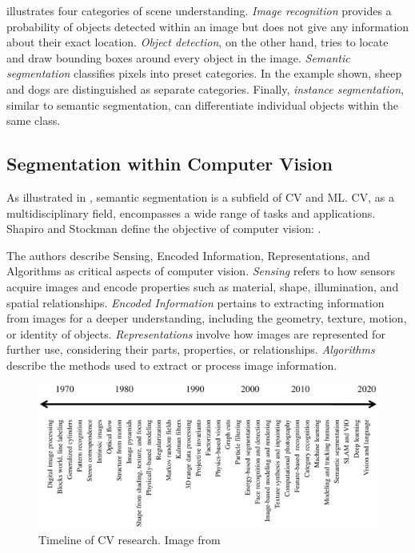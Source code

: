  illustrates four categories of scene understanding. \textit{Image recognition} provides a probability of objects detected within an image but does not give any information about their exact location. \textit{Object detection}, on the other hand, tries to locate and draw bounding boxes around every object in the image. \textit{Semantic segmentation} classifies pixels into preset categories. In the example shown, sheep and dogs are distinguished as separate categories. Finally, \textit{instance segmentation}, similar to semantic segmentation, can differentiate individual objects within the same class.
\subsection{Segmentation within Computer Vision}
As illustrated in , semantic segmentation is a subfield of \acf{CV} and \acf{ML}. \ac{CV}, as a multidisciplinary field, encompasses a wide range of tasks and applications. Shapiro and Stockman define the objective of computer vision:  \cite{shapiro2001computer}.

The authors describe Sensing, Encoded Information, Representations, and Algorithms as critical aspects of computer vision. \textit{Sensing} refers to how sensors acquire images and encode properties such as material, shape, illumination, and spatial relationships. \textit{Encoded Information} pertains to extracting information from images for a deeper understanding, including the geometry, texture, motion, or identity of objects. \textit{Representations} involve how images are represented for further use, considering their parts, properties, or relationships. \textit{Algorithms} describe the methods used to extract or process image information.\cite{shapiro2001computer}

\begin{figure}[H]%
    \centering
    \includegraphics[width=\imgWidthXL]{images/timelineCV.png}
    \caption[Timeline of \acf{CV}]{Timeline of \ac{CV} research. Image from \cite{szeliski2022computer}}
    \label{timelineCV}
\end{figure}

